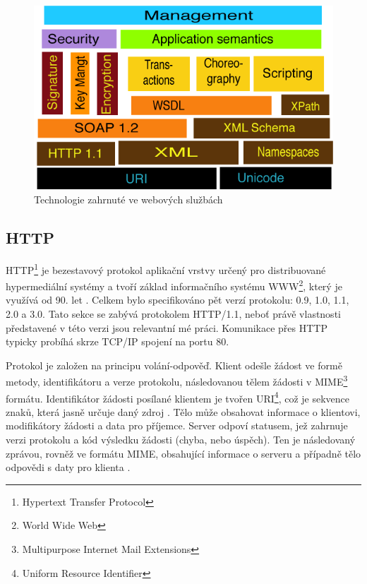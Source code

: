 \documentclass[czech,DP]{thesiskiv}
\begin{document}
\begin{figure}
	\centering
	\includegraphics[width=\linewidth]{ws-tech-stack.png}
	\caption{Technologie zahrnuté ve webových službách}
	\label{fig:ws-tech-stack}	
\end{figure}

\subsection{HTTP}

HTTP\footnote{Hypertext Transfer Protocol} je bezestavový protokol aplikační vrstvy určený pro distribuované hypermediální systémy a tvoří základ informačního systému WWW\footnote{World Wide Web}, který je využívá od 90. let \cite{httpRfc}. Celkem bylo specifikováno pět verzí protokolu: 0.9, 1.0, 1.1, 2.0 a 3.0. Tato sekce se zabývá protokolem HTTP/1.1, neboť právě vlastnosti představené v této verzi jsou relevantní mé práci. Komunikace přes HTTP typicky probíhá skrze TCP/IP spojení na portu 80. 

Protokol je založen na principu volání-odpověď. Klient odešle žádost ve formě metody, identifikátoru a verze protokolu, následovanou tělem žádosti v MIME\footnote{Multipurpose Internet Mail Extensions} formátu. Identifikátor žádosti posílané klientem je tvořen URI\footnote{Uniform Resource Identifier}, což je sekvence znaků, která jasně určuje daný zdroj \cite{uriRfc}. Tělo může obsahovat informace o klientovi, modifikátory žádosti a data pro příjemce. Server odpoví statusem, jež zahrnuje verzi protokolu a kód výsledku žádosti (chyba, nebo úspěch). Ten je následovaný zprávou, rovněž ve formátu MIME, obsahující informace o serveru a případně tělo odpovědi s daty pro klienta \cite{httpRfc}.
\end{document}
